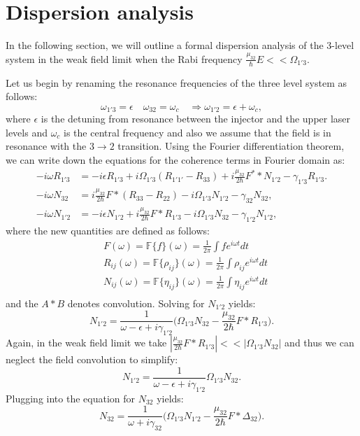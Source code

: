 \documentclass[10pt,english,fleqn]{article}%
\begin{document}
\section{Dispersion analysis}
In the following section, we will outline a formal dispersion analysis of the 3-level system in the weak field limit when the Rabi frequency $\frac{\mu_{32}}{\hbar}E << \Omega_{1'3}$. 

\noindent
Let us begin by renaming the resonance frequencies of the three level system as follows:
$$
\omega_{1'3} = \epsilon \quad \omega_{32} = \omega_c \quad \Rightarrow \omega_{1'2} = \epsilon+\omega_c,
$$
where $\epsilon$ is the detuning from resonance between the injector and the upper laser levels and $\omega_c$ is the central  frequency and also we assume that  the field is in resonance with the $3\rightarrow 2$ transition. Using the Fourier differentiation theorem, we can write down the equations for the coherence terms in Fourier domain as:
\begin{align*}
-i\omega R_{1'3}&= -i\epsilon R_{1'3} +i \Omega_{1'3}(R_{1'1'} -R_{33}) +i\frac{\mu_{32}}{2\hbar}F^**N_{1'2} -\gamma_{1'3}R_{1'3}. \\
-i\omega N_{32}   &= i \frac{\mu_{32}}{2\hbar}F*(R_{33}-R_{22}) -i\Omega_{1'3}N_{1'2} - \gamma_{32}N_{32}, \\
-i\omega N_{1'2}  &= -i \epsilon N_{1'2} +i\frac{\mu_{32}}{2\hbar}F*R_{1'3} -i\Omega_{1'3}
N_{32} -\gamma_{1'2}N_{1'2}, 
\end{align*}
where the new quantities are defined as follows:
\begin{align*}
& F(\omega) = \mathbb{F}\{ f \}(\omega) = \frac{1}{2\pi} \int {f} e^{i\omega t} dt \\
& R_{ij}(\omega) = \mathbb{F}\{ \rho_{ij} \}(\omega) = \frac{1}{2\pi} \int {\rho_{ij}} e^{i\omega t} dt \\
& N_{ij}(\omega) = \mathbb{F}\{ \eta_{ij} \}(\omega) = \frac{1}{2\pi} \int {\eta_{ij}} e^{i\omega t} dt \\
\end{align*}
and the $A*B$ denotes convolution. Solving for $N_{1'2}$ yields:
$$
N_{1'2} = \frac{1}{\omega - \epsilon+i\gamma_{1'2} } \Big ( \Omega_{1'3}N_{32} - \frac{\mu_{32}}{2\hbar}F*R_{1'3} \Big).
$$
Again, in the weak field limit we take $ |\frac{\mu_{32}}{2\hbar}F*R_{1'3} |<< |\Omega_{1'3}N_{32} |$ and thus we can neglect the field convolution to simplify:
$$
N_{1'2} = \frac{1}{\omega - \epsilon+i\gamma_{1'2} } \Omega_{1'3}N_{32}.
$$
Plugging into the equation for $N_{32}$ yields:
$$
N_{32} = \frac{1}{\omega + i\gamma_{32} } \Big ( \Omega_{1'3}N_{1'2} - \frac{\mu_{32}}{2\hbar}F*\Delta_{32} \Big).
$$
\end{document}

